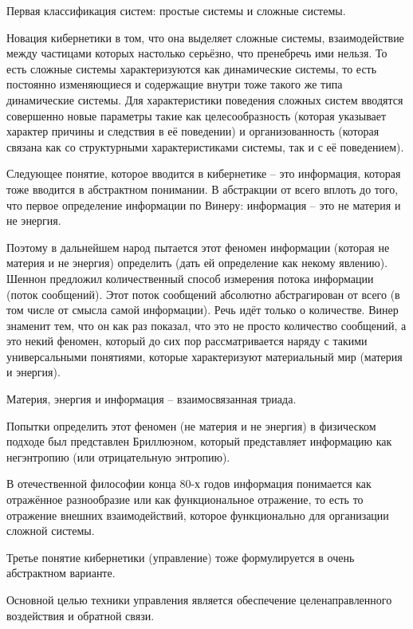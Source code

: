 \documentclass[main.tex]{subfiles}
\begin{document}
Первая классификация систем: простые системы и сложные системы.

Новация кибернетики в том, что она выделяет сложные системы, взаимодействие между частицами которых настолько серьёзно, что пренебречь ими нельзя.
То есть сложные системы характеризуются как динамические системы, то есть постоянно изменяющиеся и содержащие внутри тоже такого же типа динамические системы.
Для характеристики поведения сложных систем вводятся совершенно новые параметры такие как целесообразность (которая указывает характер причины и следствия в её поведении) и организованность (которая связана как со структурными характеристиками системы, так и с её поведением).


Следующее понятие, которое вводится в кибернетике -- это информация, которая тоже вводится в абстрактном понимании.
В абстракции от всего вплоть до того, что первое определение информации по Винеру: информация -- это не материя и не энергия.

Поэтому в дальнейшем народ пытается этот феномен информации (которая не материя и не энергия) определить (дать ей определение как некому явлению).
Шеннон предложил количественный способ измерения потока информации (поток сообщений).
Этот поток сообщений абсолютно абстрагирован от всего (в том числе от смысла самой информации).
Речь идёт только о количестве.
Винер знаменит тем, что он как раз показал, что это не просто количество сообщений, а это некий феномен, который до сих пор рассматривается наряду с такими универсальными понятиями, которые характеризуют материальный мир (материя и энергия).

Материя, энергия и информация -- взаимосвязанная триада.

Попытки определить этот феномен (не материя и не энергия) в физическом подходе был представлен Бриллюэном, который представляет информацию как негэнтропию (или отрицательную энтропию).

В отечественной философии конца 80-х годов информация понимается как отражённое разнообразие или как функциональное отражение, то есть то отражение внешних взаимодействий, которое функционально для организации сложной системы.


Третье понятие кибернетики (управление) тоже формулируется в очень абстрактном варианте.

Основной целью техники управления является обеспечение целенаправленного воздействия и обратной связи.
\end{document}
